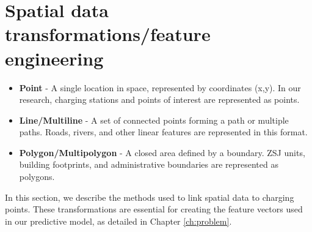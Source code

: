 \section{Spatial data transformations/feature engineering}
\label{sec:spatial-transformations}

\begin{kaobox}[frametitle=Spatial data types]

    \begin{itemize}
        \item \textbf{Point} - A single location in space, represented by coordinates (x,y). In our research, charging stations and points of interest are represented as points.
        \item \textbf{Line/Multiline} - A set of connected points forming a path or multiple paths. Roads, rivers, and other linear features are represented in this format.
        \item \textbf{Polygon/Multipolygon} - A closed area defined by a boundary. ZSJ units, building footprints, and administrative boundaries are represented as polygons.
    \end{itemize}
\end{kaobox}

In this section, we describe the methods used to link spatial data to charging points. These transformations are essential for creating the feature vectors used in our predictive model, as detailed in Chapter \ref{ch:problem}.

